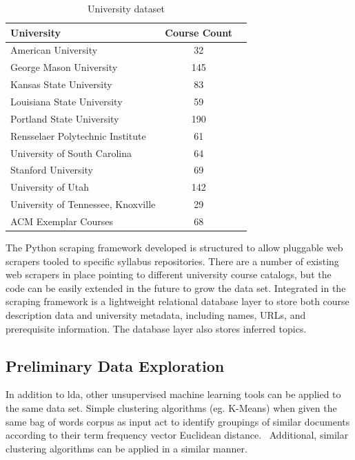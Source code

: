 \begin{table}
  \centering
  \begin{tabular}{lcl}
    \toprule
    University & Course Count \\
    \midrule
    American University & 32 \\
    George Mason University & 145 \\
    Kansas State University & 83 \\
    Louisiana State University & 59 \\
    Portland State University & 190 \\
    Rensselaer Polytechnic Institute & 61 \\
    University of South Carolina & 64 \\
    Stanford University & 69 \\
    University of Utah & 142 \\
    University of Tennessee, Knoxville & 29 \\
    \midrule
    ACM Exemplar Courses & 68 \\
    \bottomrule
  \end{tabular}
  \caption{University dataset\label{tbl:dataset}}
\end{table}


The Python scraping framework developed is structured to allow pluggable web scrapers tooled to specific syllabus repositories.
There are a number of existing web scrapers in place pointing to different university course catalogs, but the code can be easily extended in the future to grow the data set.
Integrated in the scraping framework is a lightweight relational database layer to store both course description data and university metadata, including names, URLs, and prerequisite information.
The database layer also stores inferred topics.


\subsection{Preliminary Data Exploration}
\label{sec:data-exploration}


In addition to \ac{lda}, other unsupervised machine learning tools can be applied to the same data set.
Simple clustering algorithms (eg. K-Means) when given the same bag of words corpus as input act to identify groupings of similar documents according to their term frequency vector Euclidean distance.~\cite{lloyd1982}
Additional, similar clustering algorithms can be applied in a similar manner.

